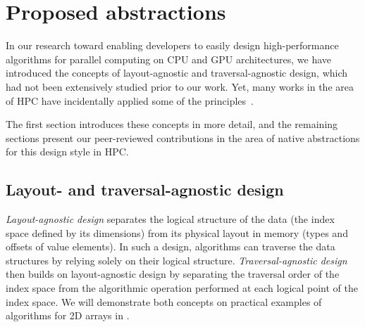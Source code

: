 \chapter{Proposed abstractions}\label{chap:abstractions}

In our research toward enabling developers to easily design high-performance algorithms for parallel computing on CPU and GPU architectures, we have introduced the concepts of layout-agnostic and traversal-agnostic design, which had not been extensively studied prior to our work.
Yet, many works in the area of HPC have incidentally applied some of the principles~\cite{trott2022mdspan,trott2021kokkos,thakkar2023cutlass}.



The first section introduces these concepts in more detail, and the remaining sections present our peer-reviewed contributions in the area of native abstractions for this design style in HPC\@.


\section{Layout- and traversal-agnostic design}\label{sec:layout-traversal-agnostic-design}

\emph{Layout-agnostic design} separates the logical structure of the data (the index space defined by its dimensions) from its physical layout in memory (types and offsets of value elements). In such a design, algorithms can traverse the data structures by relying solely on their logical structure. \emph{Traversal-agnostic design} then builds on layout-agnostic design by separating the traversal order of the index space from the algorithmic operation performed at each logical point of the index space. We will demonstrate both concepts on practical examples of algorithms for 2D arrays in \cpp.


